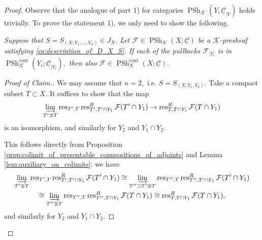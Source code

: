 \documentclass[11pt,leqno]{amsart}
\numberwithin{equation}{section}
\newcommand{\ms}[1]{\mathscr{#1}}
\newcommand{\msK}{\ms{K}}
\newcommand{\indlim}[1][]{\mathop{\varinjlim}\limits_{#1}}
\newcommand{\limproj}{\varprojlim}
\newcommand{\liminj}{\varinjlim}
\newcommand{\cont}{\operatorname{cont}}
\newcommand{\cF}{{\mathcal F}}
\newcommand{\cC}{{\mathcal C}}
\newcommand{\un}{\underline}
\newcommand{\PSh}{\operatorname{PSh}}
\newcommand{\res}{\operatorname{res}}
\begin{document}
\begin{proof}
Observe that the analogue of part 1) for categories $\PSh_{\msK}(Y,\un{\cC}_{\mid Y})$ holds trivially. To prove the statement 1), we only need to show the following.

{} {\it Suppose that $S=S_{(X;Y_1,\dots,Y_n)}\in J_X.$ Let $\cF\in\PSh_{\msK}(X;\un{\cC})$ be a $\msK$-presheaf satisfying \eqref{eq:description_of_D_X_S}. If each of the pullbacks $\cF_{\mid Y_i}$ is in $\PSh^{\cont}_{\msK}(Y_i;\un{\cC}_{\mid Y_i}),$ then also $\cF\in\PSh^{\cont}_{\msK}(X;\un{\cC}).$}

\begin{proof}[Proof of Claim.] We may assume that $n=2,$ i.e. $S=S_{(X;Y_1,Y_2)}.$ Take a compact subset $T\subset X.$ It suffices to show that the map
$$\indlim[T'\Supset T]\res_{T',T}\res_{T',T'\cap Y_1}^R\cF(T'\cap Y_1)\to \res_{T,T\cap Y_1}^R\cF(T\cap Y_1)$$
is an isomorphism, and similarly for $Y_2$ and $Y_1\cap Y_2.$

This follows directly from Proposition \ref{prop:colimit_of_presentable_compositions_of_adjoints} and Lemma \ref{lem:auxiliary_on_colimits}: we have
\begin{multline*}\indlim[T'\Supset T]\res_{T',T}\res_{T',T'\cap Y_1}^R\cF(T'\cap Y_1)\cong \indlim[T''\supset T'\Supset T]\res_{T'',T}\res_{T'',T'\cap Y_1}^R\cF(T'\cap Y_1)\\ \cong \indlim[T''\Supset T]\res_{T'',T}\res_{T'',T\cap Y_1}^R\cF(T\cap Y_1)\cong \res_{T,T\cap Y_1}^R\cF(T\cap Y_1),\end{multline*}
and similarly for $Y_2$ and $Y_1\cap Y_2.$ 
\end{proof} 



\end{proof}
\end{document}
